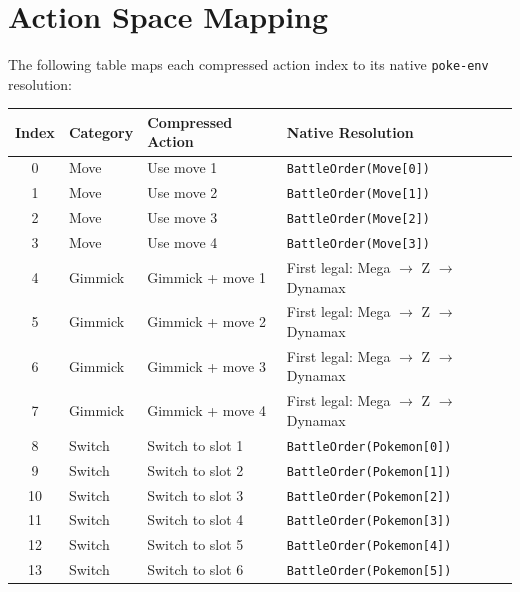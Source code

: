 \section{Action Space Mapping}

The following table maps each compressed action index to its native
\texttt{poke-env} resolution:

\begin{center}
\small
\begin{tabularx}{\textwidth}{c l l l}
  \toprule
  \textbf{Index} & \textbf{Category} & \textbf{Compressed Action} & \textbf{Native Resolution} \\
  \midrule
  0  & Move   & Use move 1 & \texttt{BattleOrder(Move[0])} \\
  1  & Move   & Use move 2 & \texttt{BattleOrder(Move[1])} \\
  2  & Move   & Use move 3 & \texttt{BattleOrder(Move[2])} \\
  3  & Move   & Use move 4 & \texttt{BattleOrder(Move[3])} \\
  4  & Gimmick & Gimmick + move 1 & First legal: Mega $\to$ Z $\to$ Dynamax \\
  5  & Gimmick & Gimmick + move 2 & First legal: Mega $\to$ Z $\to$ Dynamax \\
  6  & Gimmick & Gimmick + move 3 & First legal: Mega $\to$ Z $\to$ Dynamax \\
  7  & Gimmick & Gimmick + move 4 & First legal: Mega $\to$ Z $\to$ Dynamax \\
  8  & Switch & Switch to slot 1 & \texttt{BattleOrder(Pokemon[0])} \\
  9  & Switch & Switch to slot 2 & \texttt{BattleOrder(Pokemon[1])} \\
  10 & Switch & Switch to slot 3 & \texttt{BattleOrder(Pokemon[2])} \\
  11 & Switch & Switch to slot 4 & \texttt{BattleOrder(Pokemon[3])} \\
  12 & Switch & Switch to slot 5 & \texttt{BattleOrder(Pokemon[4])} \\
  13 & Switch & Switch to slot 6 & \texttt{BattleOrder(Pokemon[5])} \\
  \bottomrule
\end{tabularx}
\end{center}
